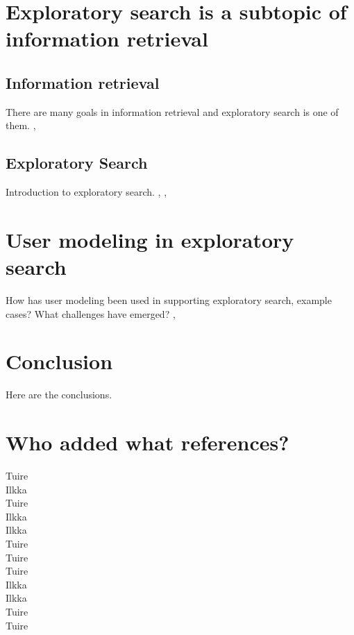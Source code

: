 \documentclass{sigchi}
\begin{document}
\section {Exploratory search is a subtopic of information retrieval}

\subsection{Information retrieval}
There are many goals in information retrieval and exploratory search is one of them.
\cite{hearst02}, \cite{kuhlt91}

\subsection{Exploratory Search}
Introduction to exploratory search.
\cite{march06}, \cite{white09}, \cite{tvaro11}

\section{User modeling in exploratory search}
How has user modeling been used in supporting exploratory search, example cases? What challenges have emerged? 
\cite{oconnor10}, \cite{sugi04}

\section{Conclusion}
Here are the conclusions.

\section{Who added what references?}
\cite{rich99} Tuire \\
\cite{fischer01} Ilkka \\
\cite{dillon96} Tuire \\
\cite{bunt04} Ilkka \\
\cite{findlater04} Ilkka \\
\cite{hearst02} Tuire \\
\cite{kuhlt91} Tuire \\
\cite{march06} Tuire \\
\cite{white09} Ilkka \\
\cite{tvaro11} Ilkka \\
\cite{oconnor10} Tuire \\
\cite{sugi04} Tuire \\

\nocite{*} %
\end{document}
